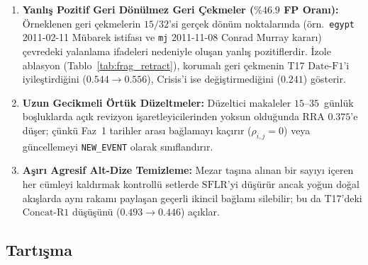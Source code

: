﻿\documentclass[journal]{IEEEtran}
\begin{document}
\begin{enumerate}
    \item \textbf{Yanl{\i}\c{s} Pozitif Geri D\"{o}n\"{u}lmez Geri \c{C}ekmeler ($\%46.9$ FP Oran{\i}):} \"{O}rneklenen geri \c{c}ekmelerin $15/32$'si ger\c{c}ek d\"{o}n\"{u}m noktalar{\i}nda (\"{o}rn.\ \texttt{egypt} 2011-02-11 M\"{u}barek istifas{\i} ve \texttt{mj} 2011-11-08 Conrad Murray karar{\i}) \c{c}evredeki yalanlama ifadeleri nedeniyle olu\c{s}an yanl{\i}\c{s} pozitiflerdir. \.{I}zole ablasyon (Tablo~\ref{tab:frag_retract}), korumal{\i} geri \c{c}ekmenin T17 $\text{Date-F1}$'i iyile\c{s}tirdi\u{g}ini ($0.544 \to 0.556$), Crisis'i ise de\u{g}i\c{s}tirmedi\u{g}ini ($0.241$) g\"{o}sterir.
    \item \textbf{Uzun Gecikmeli \"{O}rt\"{u}k D\"{u}zeltmeler:} D\"{u}zeltici makaleler $15\text{--}35$~g\"{u}nl\"{u}k bo\c{s}luklarda a\c{c}{\i}k revizyon i\c{s}aretleyicilerinden yoksun oldu\u{g}unda $\text{RRA}$ $0.375$'e d\"{u}\c{s}er; \c{c}\"{u}nk\"{u} Faz~1 tarihler aras{\i} ba\u{g}lamay{\i} ka\c{c}{\i}r{\i}r ($\rho_{i,j}=0$) veya g\"{u}ncellemeyi \texttt{NEW\_EVENT} olarak s{\i}n{\i}fland{\i}r{\i}r.
    \item \textbf{A\c{s}{\i}r{\i} Agresif Alt-Dize Temizleme:} Mezar ta\c{s}{\i}na al{\i}nan bir say{\i}y{\i} i\c{c}eren her c\"{u}mleyi kald{\i}rmak kontroll\"{u} setlerde $\text{SFLR}$'yi d\"{u}\c{s}\"{u}r\"{u}r ancak yo\u{g}un do\u{g}al ak{\i}\c{s}larda ayn{\i} rakam{\i} payla\c{s}an ge\c{c}erli ikincil ba\u{g}lam{\i} silebilir; bu da T17'deki $\text{Concat-R1}$ d\"{u}\c{s}\"{u}\c{s}\"{u}n\"{u} ($0.493 \to 0.446$) a\c{c}{\i}klar.
\end{enumerate}

\subsection{Tart{\i}\c{s}ma}
\label{subsec:discussion}
\end{document}
